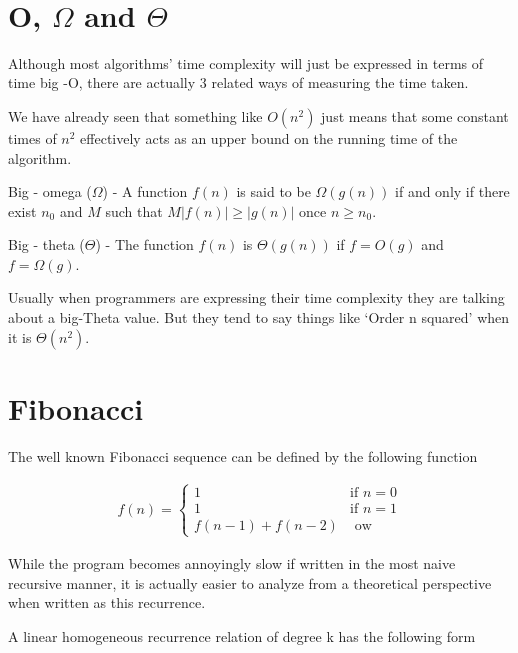 \documentclass[12pt]{article}
\begin{document}
\begin{center}
\\
\vspace{1cm}
\end{center}

\vspace{0.5cm}\noindent

\section*{O, $\Omega$ and $\Theta$}
Although most algorithms' time complexity will just be expressed in terms of time big -O, there are actually 3 related ways of measuring the time taken. 

We have already seen that something like $O(n^2)$ just means that some constant times of $n^2$ effectively acts as an upper bound on the running time of the algorithm.

Big - omega ($\Omega$) - A function $f(n)$ is said to be $\Omega(g(n))$ if and only if there exist $n_0$ and $M$ such that $M|f(n)| \ge |g(n)|$ once $n \ge n_0$.

Big - theta ($\Theta$) - The function $f(n)$ is $\Theta(g(n))$ if $f=O(g)$ and $f=\Omega(g)$.

Usually when programmers are expressing their time complexity they are talking about a big-Theta value. But they tend to say things like `Order n squared'  when it is $\Theta(n^2)$.


\section*{Fibonacci}
The well known Fibonacci sequence can be defined by the following function

\begin{align*}
f(n) = \begin{cases}
1 & \mbox{if } n=0 \\
1 & \mbox{if } n = 1 \\
f(n-1) + f(n-2) & \mbox{ ow }
\end{cases}
\end{align*}

While the program becomes annoyingly slow if written in the most naive recursive manner, it is actually easier to analyze from a theoretical perspective when written as this recurrence.

A linear homogeneous recurrence relation of degree k has the following form
\end{document}
